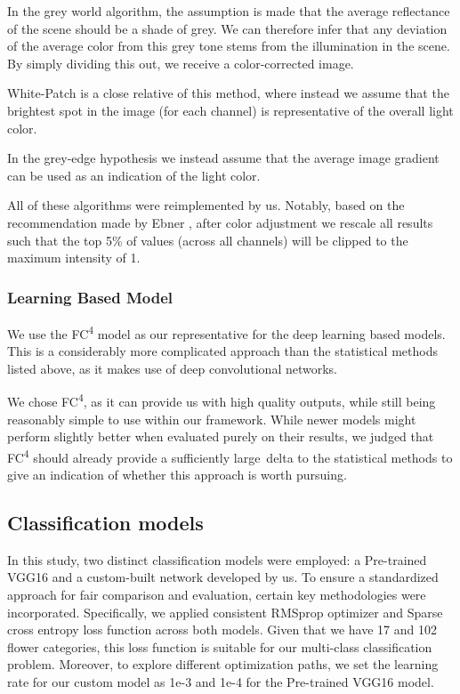 In the grey world algorithm, the assumption is made that the average reflectance of the scene should
be a shade of grey. We can therefore infer that any deviation of the average color from this grey tone stems from
the illumination in the scene. By simply dividing this out, we receive a color-corrected image.

White-Patch is a close relative of this method, where instead we assume that the brightest spot in the image (for each channel)
is representative of the overall light color.

In the grey-edge hypothesis we instead assume that the average image gradient can be used as an indication of the light color.

All of these algorithms were reimplemented by us. Notably, based on the recommendation made by Ebner \cite{EbnerConstancy},
after color adjustment we rescale all results such that the top 5\% of values (across all channels) will be clipped to
the maximum intensity of 1.

\subsubsection{Learning Based Model}

We use the FC\textsuperscript{4} model\cite{hu2017fc} as our representative for the deep learning based models. This is a considerably more complicated approach
than the statistical methods listed above, as it makes use of deep convolutional networks.

We chose FC\textsuperscript{4}, as it can provide us with high quality outputs, while still being reasonably simple to use within our framework. While newer
models might perform slightly better when evaluated purely on their results, we judged that FC\textsuperscript{4} should already provide a sufficiently large\
delta to the statistical methods to give an indication of whether this approach is worth pursuing.

\subsection{Classification models}

In this study, two distinct classification models were employed: a Pre-trained VGG16 and a custom-built network developed by us.
To ensure a standardized approach for fair comparison and evaluation, certain key methodologies were incorporated.
Specifically, we applied consistent RMSprop optimizer and Sparse cross entropy loss function across both models.
Given that we have 17 and 102 flower categories, this loss function is suitable for our multi-class classification problem. Moreover, to explore different optimization paths, we set the learning rate
for our custom model as 1e-3 and 1e-4 for the Pre-trained VGG16 model.


